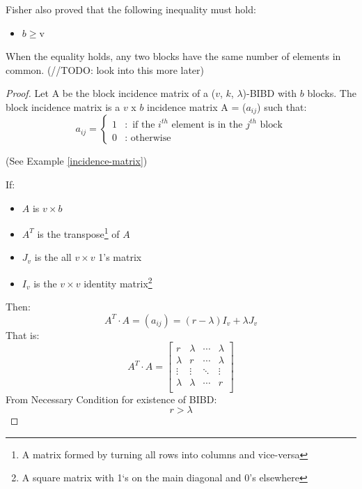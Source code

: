 \documentclass[12pt]{article}
\theoremstyle{definition}
\begin{document}
Fisher also proved that the following inequality must hold: 
\begin{itemize}
\item $b \geq $v
\end{itemize}
When the equality holds, any two blocks have the same number of elements in common. (//TODO: look into this more later)
\begin{proof}
Let A be the block incidence matrix of a ($v$, $k$, $\lambda$)-BIBD with $b$ blocks. The block incidence matrix is a $v$ x $b$ incidence matrix A = ($a_{ij}$) such that:  
\begin{equation*}
a_{ij} = \begin{cases}
               1 & : \text{ if the } i^{th} \text { element is in the } j^{th} \text { block} \\
               0 & : \text{ otherwise}
           \end{cases}
\end{equation*}
\begin{center}
(See Example \ref{incidence-matrix})
\end{center}
If: 
\begin{itemize}
\item $A$ is $v\times{b}$
\item $A^T$ is the transpose\footnote{A matrix formed by turning all rows into columns and vice-versa} of $A$
\item $J_v$ is the all $v\times{v}$ 1's matrix
\item $I_v$ is the $v\times{v}$ identity matrix\footnote{A square matrix with 1`s on the main diagonal and 0's elsewhere}
\end{itemize}
Then: 
\begin{equation}
A^T \cdot A = \left({a_{ij}}\right) = \left({r - \lambda}\right) I_v + \lambda J_v
\end{equation} 
That is:
\begin{equation}
A^T \cdot A = \begin{bmatrix} 
r & \lambda & \cdots & \lambda \\
\lambda & r & \cdots & \lambda \\
\vdots & \vdots & \ddots & \vdots \\
\lambda & \lambda & \cdots & r \\
\end{bmatrix}
\end{equation}
From Necessary Condition for existence of BIBD\cite{necessaryBIBDCondition}:
\begin{equation*}
r > \lambda

\end{equation*}
\end{proof}
\end{document}
